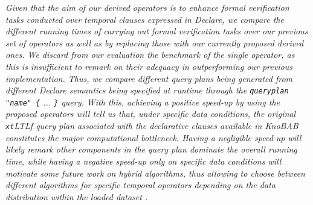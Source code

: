 \documentclass[sigconf]{acmart}
\begin{document}
\textit{Given that the aim of our derived operators is to enhance formal verification tasks conducted over temporal clauses expressed in Declare, we compare the different running times of carrying out formal verification tasks over our previous set of operators as well as by replacing those with our currently proposed derived ones. We discard from our evaluation the benchmark of the single operator, as this is insufficient to remark on their adequacy in outperforming our previous implementation. Thus, we compare different query plans being generated from different Declare semantics being specified at runtime through the \texttt{queryplan "name" \{} ... \texttt{\}} query.  %
With this, achieving a positive speed-up by using the proposed operators will tell us that, under specific data conditions, the original \texttt{xt}LTL\textsf{f} query plan associated with the declarative clauses available in KnoBAB constitutes the major computational bottleneck. Having a negligible speed-up will likely remark  other components in the query plan dominate the overall running time, while having a negative speed-up only on specific data conditions will motivate some future work on hybrid algorithms, thus allowing to choose between different algorithms for specific temporal operators depending on the data distribution within the loaded dataset \cite{DBLP:journals/spe/Musser97}.} \medskip
\end{document}
